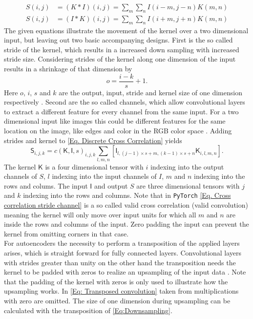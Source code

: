\begin{align}
	S(i,j) &= (K * I)(i,j) = \sum_{m}\sum_{n}I(i-m,j-n)K(m,n) 
	\label{Eq. Discrete Convolution Flip}\\
	S(i,j) &= (I * K)(i,j) = \sum_{m}\sum_{n}I(i+m,j+n)K(m,n) 
	\label{Eq. Discrete Cross Correlation}
\end{align}
The given equations illustrate the movement of the kernel over a two dimensional input, but leaving out two basic accompanying designs. First is the so called stride of the kernel, which results in a increased down sampling with increased stride size. Considering strides of the kernel along one dimension of the input results in a shrinkage of that dimension by 
\begin{equation}\label{Eq:Downsampling}
	o = \frac{i -k}{s} + 1.
\end{equation} 
Here \(o\), \(i\), \(s\) and \(k\) are the output, input, stride and kernel size of one dimension respectively \cite{dumoulin2018guide}. Second are the so called channels, which allow convolutional layers to extract a different feature for every channel from the same input. For a two dimensional input like images this could be different features for the same location on the image, like edges and color in the RGB color space \cite{Goodfellow}. Adding strides and kernel to \cref{Eq. Discrete Cross Correlation} yields
\begin{equation}
	\mathsf{S}_{i,j,k} = c(\mathsf{K},\mathsf{I},s)_{i,j,k}\sum_{l,m,n}\left[\mathsf{I}_{l,(j-1)\times s+m,(k -1)\times s+n}\mathsf{K}_{i,l,m,n}\right]. \label{Eq. Cross correlation stride channel}
\end{equation}
The kernel \(\mathsf{K}\) is a four dimensional tensor with \(i\) indexing into the output channels of \(S\), \(l\) indexing into the input channels of \(I\), \(m\) and \(n\) indexing into the rows and colums. The input \(\mathsf{I}\) and output \(S\) are three dimensional tensors with \(j\) and \(k\) indexing into the rows and columns. Note that in \texttt{PyTorch} \cref{Eq. Cross correlation stride channel} is a so called valid cross correlation (valid convolution) \cite{bibid} meaning the kernel will only move over input units for which  all \(m\) and \(n\) are inside the rows and columns of the input. Zero padding the input can prevent the kernel from omitting corners in that case.
\\
For autoencoders the necessity to perform a transposition of the applied layers arises, which is straight forward for fully connected layers. Convolutional layers with strides greater than unity on the other hand  the transposition needs the kernel to be padded with zeros to realize an upsampling of the input data \cite{dumoulin2018guide}. Note that the padding of the kernel with zeros is only used to illustrate how the upsampling works. In \cref{Eq: Transposed convolution} taken from \cite{Goodfellow} multiplications with zero are omitted. The size of one dimension during upsampling can be calculated with the transposition of \cref{Eq:Downsampling}.
